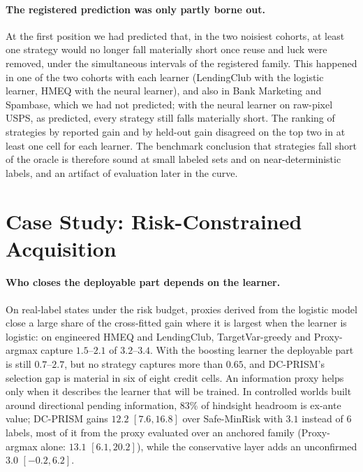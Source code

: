 \documentclass[runningheads]{llncs}
\begin{document}
\paragraph{The registered prediction was only partly borne out.} At the first position we had predicted that, in the two noisiest cohorts, at least one strategy would no longer fall materially short once reuse and luck were removed, under the simultaneous intervals of the registered family. This happened in one of the two cohorts with each learner (LendingClub with the logistic learner, HMEQ with the neural learner), and also in Bank Marketing and Spambase, which we had not predicted; with the neural learner on raw-pixel USPS, as predicted, every strategy still falls materially short. The ranking of strategies by reported gain and by held-out gain disagreed on the top two in at least one cell for each learner. The benchmark conclusion that strategies fall short of the oracle is therefore sound at small labeled sets and on near-deterministic labels, and an artifact of evaluation later in the curve.

\section{Case Study: Risk-Constrained Acquisition}
\label{sec:replay}
\paragraph{Who closes the deployable part depends on the learner.} On real-label states under the risk budget, proxies derived from the logistic model close a large share of the cross-fitted gain where it is largest when the learner is logistic: on engineered HMEQ and LendingClub, TargetVar-greedy and Proxy-argmax capture $1.5$--$2.1$ of $3.2$--$3.4$. With the boosting learner the deployable part is still $0.7$--$2.7$, but no strategy captures more than $0.65$, and DC-PRISM's selection gap is material in six of eight credit cells. An information proxy helps only when it describes the learner that will be trained. In controlled worlds built around directional pending information, 83\% of hindsight headroom is ex-ante value; DC-PRISM gains $12.2$ $[7.6,16.8]$ over Safe-MinRisk with $3.1$ instead of 6 labels, most of it from the proxy evaluated over an anchored family (Proxy-argmax alone: $13.1$ $[6.1,20.2]$), while the conservative layer adds an unconfirmed $3.0$ $[-0.2,6.2]$.
\end{document}
